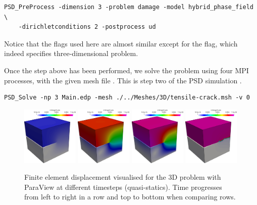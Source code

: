 {{\begin{lstlisting}[style=BashInputStyle]
	PSD_PreProcess -dimension 3 -problem damage -model hybrid_phase_field  \
	-dirichletconditions 2 -postprocess ud 
\end{lstlisting}

Notice that the flags used here are almost similar except for the    flag, which indeed specifies three-dimensional problem.

Once the step above has been performed, we solve the problem using four MPI processes, with the given mesh file . This is step two of the PSD simulation   .

\begin{lstlisting}[style=BashInputStyle]
	PSD_Solve -np 3 Main.edp -mesh ./../Meshes/3D/tensile-crack.msh -v 0
\end{lstlisting}

\begin{figure}[h!]
	\centering
	
	\includegraphics[width=0.24\textwidth]{./Images/u3d0.png}
	\includegraphics[width=0.24\textwidth]{./Images/u3d1.png} 
	\includegraphics[width=0.24\textwidth]{./Images/u3d2.png}
	\includegraphics[width=0.24\textwidth]{./Images/u3d3.png}
	\caption{Finite element displacement visualised for the 3D problem with ParaView at different timesteps (quasi-statics). Time progresses from left to right in a row and top to bottom when comparing rows. \label{u3d-fem}}
\end{figure}



}}
